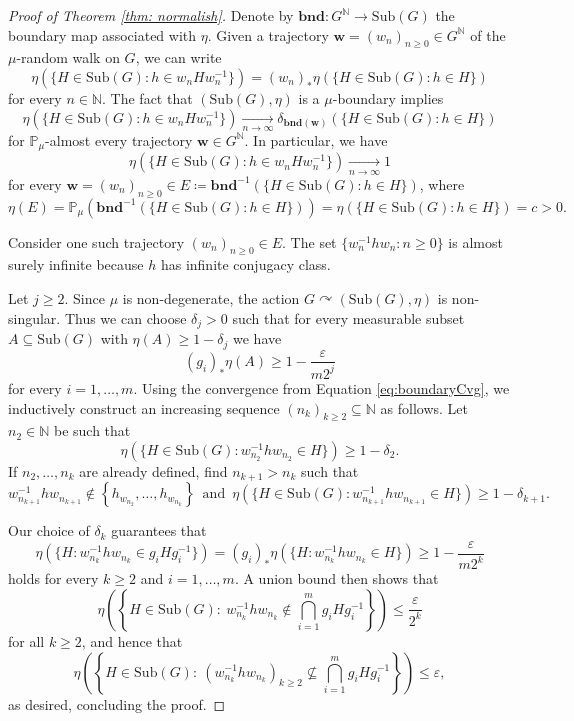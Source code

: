 \documentclass[reqno,a4paper,11pt]{amsart}
\numberwithin{equation}{section}
\newcommand{\1}{\mathbf{1}}
\def\N{{\mathbb N}}
\newcommand{\sub}[1]{\mathrm{Sub}(#1)}
\let\epsilon\varepsilon
\theoremstyle{definition}
\begin{document}
\begin{proof}[Proof of Theorem \ref{thm: normalish}]
	Denote by $\mathbf{bnd} \colon G^\N\to \sub{G}$ the boundary map associated with $\eta$. Given a trajectory $\mathbf{w}=(w_n)_{n \geq 0} \in G^{\N}$ of the $\mu$-random walk on $G$, we can write
	\[
	\eta(\{H \in \sub{G} : h \in w_nHw_n^{-1}\}) = (w_n)_* \eta(\{H \in \sub{G} : h \in H\})
	\]
	for every $n\in \N$. The fact that $(\sub{G}, \eta)$ is a $\mu$-boundary implies
	\[
	\eta(\{H \in \sub{G} : h \in w_nHw_n^{-1}\}) \xrightarrow[n\to\infty]{} \delta_{\mathbf{bnd}(\mathbf{w})}(\{H \in \sub{G} : h \in H \})
	\]
	for $\mathbb{P}_{\mu}$-almost every trajectory $\mathbf{w} \in G^\N$. In particular, we have
	\begin{equation}\label{eq:boundaryCvg}
		\eta\left(\{H \in \sub{G} : h \in w_nHw_n^{-1}\}\right) \xrightarrow[n\to\infty]{}  1
	\end{equation}
	for every $\mathbf{w}=(w_n)_{n \geq 0}\in E\coloneqq \mathbf{bnd}^{-1}\left(\{H \in \sub{G} : h \in H\}\right)$, where
	\[
	\eta(E)=\mathbb{P_{\mu}}(\mathbf{bnd}^{-1}(\{H \in \sub{G} : h \in H\})) = \eta (\{ H \in \sub{G} : h \in H\}) = c >0.
	\]
	
	Consider one such trajectory $(w_n)_{n \geq 0}\in E$. The set $\{w_n^{-1}hw_n : n \geq 0\}$ is almost surely infinite because $h$ has infinite conjugacy class.
	
	Let $j \geq 2$. Since $\mu$ is non-degenerate, the action $G \curvearrowright (\mathrm{Sub}(G), \eta)$ is non-singular. Thus we can choose $\delta_j > 0$ such that for every measurable subset $A \subseteq \mathrm{Sub}(G)$ with $\eta(A) \geq 1 - \delta_j$ we have
	\[
	(g_i)_\ast\eta(A) \geq 1 - \frac{\varepsilon}{m 2^j}
	\]
	for every $i = 1,\ldots, m$. Using the convergence from Equation \eqref{eq:boundaryCvg}, we inductively construct an increasing sequence $(n_k)_{k \geq 2} \subseteq \N$ as follows. Let $n_2 \in \N$ be such that
	\[
	\eta(\{H \in \mathrm{Sub}(G) : w_{n_2}^{-1}hw_{n_2} \in H\}) \geq 1 - \delta_2.
	\]
	If $n_2, \ldots, n_k$ are already defined, find $n_{k+1} > n_k$ such that
	\[
	w_{n_{k+1}}^{-1}hw_{n_{k+1}}\notin \left\{h_{w_{n_2}},\ldots, h_{w_{n_k}} \right\} \, \text{ and }\, \eta(\{H \in \mathrm{Sub}(G) : w_{n_{k+1}}^{-1}hw_{n_{k+1}} \in H\}) \geq 1 - \delta_{k+1}.
	\]
	
	Our choice of $\delta_k$ guarantees that
	\begin{equation}\label{eq:csinequality}
		\eta(\{H : w_{n_k}^{-1}h w_{n_k} \in g_iHg_i^{-1}\}) = (g_i)_\ast \eta(\{H : w_{n_k}^{-1}hw_{n_k} \in H\}) \geq 1 - \frac{\varepsilon}{m 2^k}
	\end{equation}
	holds for every $k \geq 2$ and $i = 1, \ldots, m$. A union bound then shows that
	\[
	\eta\left(\left\{H \in \mathrm{Sub}(G) : \  w_{n_k}^{-1}h w_{n_k} \not \in \bigcap_{i = 1}^m g_iHg_i^{-1}\right\}\right) \leq\frac{\varepsilon}{2^k}
	\]
	for all $k \geq 2$, and hence that
	\[
	\eta\left(\left\{H \in \mathrm{Sub}(G) : \  (w_{n_k}^{-1}hw_{n_k})_{k \geq 2} \not \subseteq \bigcap_{i = 1}^m g_iHg_i^{-1}\right\}\right) \leq \epsilon,
	\]
	as desired, concluding the proof.
\end{proof}
\end{document}

